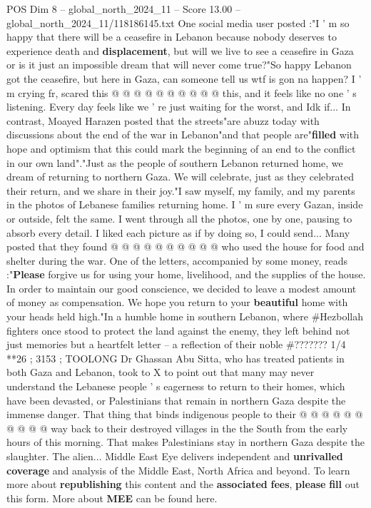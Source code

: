 \begin{textsample}{POS Dim 8 – global\_north\_2024\_11 – Score 13.00 – global\_north\_2024\_11/118186145.txt}
One social media user posted :"I ' m so happy that there will be a ceasefire in Lebanon because nobody deserves to experience death and \textbf{displacement}, but will we live to see a ceasefire in Gaza or is it just an impossible dream that will never come true?"So happy Lebanon got the ceasefire, but here in Gaza, can someone tell us wtf is gon na happen?
I ' m crying fr, scared this @ @ @ @ @ @ @ @ @ @ this, and it feels like no one ' s listening.
Every day feels like we ' re just waiting for the worst, and Idk if...
In contrast, Moayed Harazen posted that the streets"are abuzz today with discussions about the end of the war in Lebanon"and that people are"\textbf{filled} with hope and optimism that this could mark the beginning of an end to the conflict in our own land"."Just as the people of southern Lebanon returned home, we dream of returning to northern Gaza.
We will celebrate, just as they celebrated their return, and we share in their joy."I saw myself, my family, and my parents in the photos of Lebanese families returning home.
I ' m sure every Gazan, inside or outside, felt the same.
I went through all the photos, one by one, pausing to absorb every detail.
I liked each picture as if by doing so, I could send...
Many posted that they found @ @ @ @ @ @ @ @ @ @ who used the house for food and shelter during the war.
One of the letters, accompanied by some money, reads :"\textbf{Please} forgive us for using your home, livelihood, and the supplies of the house.
In order to maintain our good conscience, we decided to leave a modest amount of money as compensation.
We hope you return to your \textbf{beautiful} home with your heads held high."In a humble home in southern Lebanon, where \#Hezbollah fighters once stood to protect the land against the enemy, they left behind not just memories but a heartfelt letter -- a reflection of their noble \#??????? 1/4 **26 ; 3153 ; TOOLONG Dr Ghassan Abu Sitta, who has treated patients in both Gaza and Lebanon, took to X to point out that many may never understand the Lebanese people ' s eagerness to return to their homes, which have been devasted, or Palestinians that remain in northern Gaza despite the immense danger.
That thing that binds indigenous people to their @ @ @ @ @ @ @ @ @ @ way back to their destroyed villages in the the South from the early hours of this morning.
That makes Palestinians stay in northern Gaza despite the slaughter.
The alien...
Middle East Eye delivers independent and \textbf{unrivalled} \textbf{coverage} and analysis of the Middle East, North Africa and beyond.
To learn more about \textbf{republishing} this content and the \textbf{associated} \textbf{fees}, \textbf{please} \textbf{fill} out this form.
More about \textbf{MEE} can be found here.

\end{textsample}

